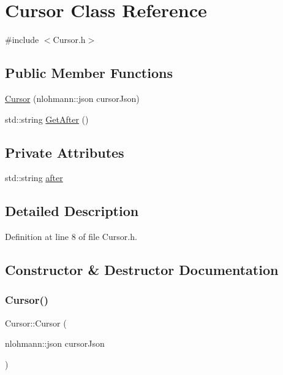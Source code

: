 \hypertarget{class_cursor}{}\section{Cursor Class Reference}
\label{class_cursor}


{\ttfamily \#include $<$Cursor.\+h$>$}

\subsection*{Public Member Functions}
\begin{DoxyCompactItemize}
\item 
\mbox{\hyperlink{class_cursor_aed79b00ad9a360588f7155424e7bf819}{Cursor}} (nlohmann\+::json cursor\+Json)
\item 
std\+::string \mbox{\hyperlink{class_cursor_aeeaeb893dc965470605484337aba8f23}{Get\+After}} ()
\end{DoxyCompactItemize}
\subsection*{Private Attributes}
\begin{DoxyCompactItemize}
\item 
std\+::string \mbox{\hyperlink{class_cursor_a0428610a0f936e0cc244ef330742fd49}{after}}
\end{DoxyCompactItemize}


\subsection{Detailed Description}


Definition at line 8 of file Cursor.\+h.



\subsection{Constructor \& Destructor Documentation}
\mbox{\label{class_cursor_aed79b00ad9a360588f7155424e7bf819}} 
\subsubsection{\texorpdfstring{Cursor()}{Cursor()}}
{\footnotesize\ttfamily Cursor\+::\+Cursor (\begin{DoxyParamCaption}\item[{nlohmann\+::json}]{cursor\+Json }\end{DoxyParamCaption})}



